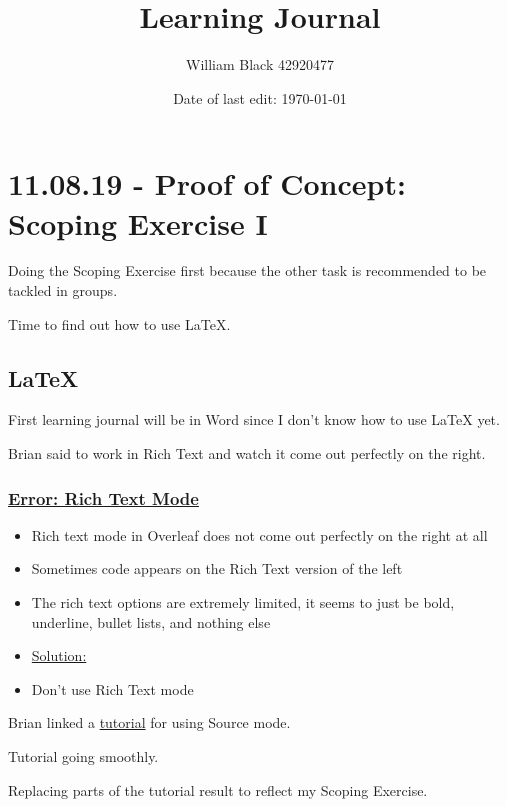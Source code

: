 \documentclass[12pt]{article}
\title{\textbf{Learning Journal}}
\date{Date of last edit: \today}
\author{William Black 42920477}
\begin{document}
\tableofcontents

\maketitle\section{11.08.19 - Proof of Concept: Scoping Exercise I}

Doing the Scoping Exercise first because the other task is recommended to be tackled in groups.

Time to find out how to use LaTeX.

\subsection{LaTeX}

First learning journal will be in Word since I don’t know how to use LaTeX yet.

Brian said to work in Rich Text and watch it come out perfectly on the right.

\subsubsection{\texorpdfstring{\underline{Error: Rich Text Mode}}{}}\label{error:er1}
\begin{itemize}
    \item Rich text mode in Overleaf does not come out perfectly on the right at all
    \item Sometimes code appears on the Rich Text version of the left
    \item The rich text options are extremely limited, it seems to just be bold, underline, bullet lists, and nothing else
\end{itemize}
\begin{itemize}
\renewcommand{\labelitemi}{}
    \item\underline{Solution:}
\renewcommand{\labelitemi}{$\bullet$}
    \item Don’t use Rich Text mode
\end{itemize}

Brian linked a \href{https://www.overleaf.com/learn/latex/Creating_a_document_in_LaTeX}{tutorial} for using Source mode.

Tutorial going smoothly.

Replacing parts of the tutorial result to reflect my Scoping Exercise.
\end{document}
